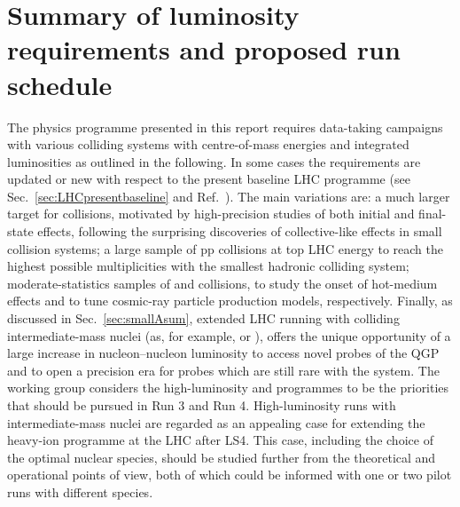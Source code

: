 \documentclass[../report.tex]{subfiles}
\begin{document}
\section{Summary of luminosity requirements and proposed run schedule}
\label{sec:schedule}

The physics programme presented in this report requires data-taking campaigns with various colliding systems with centre-of-mass energies and integrated luminosities \Lint as outlined in the following. In some cases the requirements are updated or new with respect to the present baseline LHC programme (see Sec.~\ref{sec:LHCpresentbaseline} and Ref.~\cite{Abelevetal:2014cna}). The main variations are: a much larger \Lint target for \pPb collisions, motivated by high-precision studies of both initial and final-state effects, following the surprising discoveries of collective-like effects in small collision systems; a large sample of pp collisions at top LHC energy to reach the highest possible multiplicities with the smallest hadronic colliding system; moderate-statistics samples of \OO and \pO collisions, to study the onset of hot-medium effects and to tune cosmic-ray particle production models, respectively. Finally, as discussed in Sec.~\ref{sec:smallAsum}, extended LHC running with colliding intermediate-mass nuclei (as, for example, \ArAr or \KrKr), offers the unique opportunity of a large increase in nucleon--nucleon luminosity to access novel probes of the QGP and to open a precision era for probes which are still rare with the \PbPb system. The working group considers the high-luminosity \PbPb and \pPb programmes to be the priorities that should be pursued in Run 3 and Run 4. High-luminosity runs with intermediate-mass nuclei are regarded as an appealing case for extending the heavy-ion programme at the LHC after LS4.
This case, including the choice of the optimal nuclear species, should be studied further from the theoretical and operational points of view, both of which could be informed with one or two pilot runs with different species. 
\end{document}
